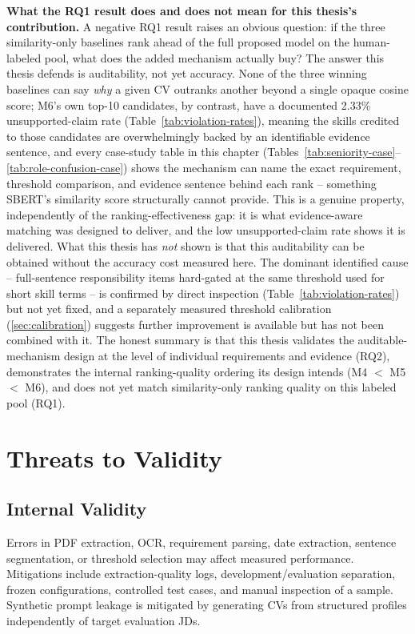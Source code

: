\documentclass[12pt,a4paper,oneside]{report}
\begin{document}
\textbf{What the RQ1 result does and does not mean for this thesis's contribution.} A negative RQ1 result raises an obvious question: if the three similarity-only baselines rank ahead of the full proposed model on the human-labeled pool, what does the added mechanism actually buy? The answer this thesis defends is auditability, not yet accuracy. None of the three winning baselines can say \emph{why} a given CV outranks another beyond a single opaque cosine score; M6's own top-10 candidates, by contrast, have a documented 2.33\% unsupported-claim rate (Table~\ref{tab:violation-rates}), meaning the skills credited to those candidates are overwhelmingly backed by an identifiable evidence sentence, and every case-study table in this chapter (Tables~\ref{tab:seniority-case}--\ref{tab:role-confusion-case}) shows the mechanism can name the exact requirement, threshold comparison, and evidence sentence behind each rank -- something SBERT's similarity score structurally cannot provide. This is a genuine property, independently of the ranking-effectiveness gap: it is what evidence-aware matching was designed to deliver, and the low unsupported-claim rate shows it is delivered. What this thesis has \emph{not} shown is that this auditability can be obtained without the accuracy cost measured here. The dominant identified cause -- full-sentence responsibility items hard-gated at the same threshold used for short skill terms -- is confirmed by direct inspection (Table~\ref{tab:violation-rates}) but not yet fixed, and a separately measured threshold calibration (\cref{sec:calibration}) suggests further improvement is available but has not been combined with it. The honest summary is that this thesis validates the auditable-mechanism design at the level of individual requirements and evidence (RQ2), demonstrates the internal ranking-quality ordering its design intends (M4 $<$ M5 $<$ M6), and does not yet match similarity-only ranking quality on this labeled pool (RQ1).

\section{Threats to Validity}
\subsection{Internal Validity}
Errors in PDF extraction, OCR, requirement parsing, date extraction, sentence segmentation, or threshold selection may affect measured performance. Mitigations include extraction-quality logs, development/evaluation separation, frozen configurations, controlled test cases, and manual inspection of a sample. Synthetic prompt leakage is mitigated by generating CVs from structured profiles independently of target evaluation JDs.
\end{document}
